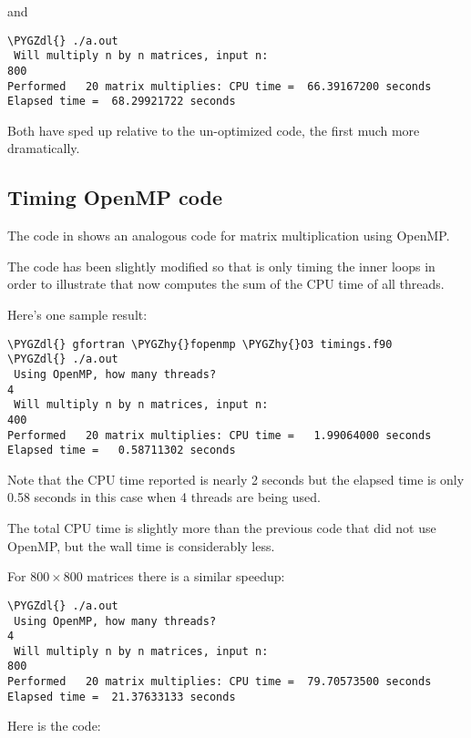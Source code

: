 \documentclass[letterpaper,10pt,english]{sphinxmanual}
\def\PYGZdl{\char`\$}
\def\PYGZhy{\char`\-}
\begin{document}
and

\begin{Verbatim}[commandchars=\\\{\}]
\PYGZdl{} ./a.out
 Will multiply n by n matrices, input n:
800
Performed   20 matrix multiplies: CPU time =  66.39167200 seconds
Elapsed time =  68.29921722 seconds
\end{Verbatim}

Both have sped up relative to the un-optimized code, the first much more
dramatically.


\subsection{Timing OpenMP code}
\label{timing:timing-openmp-code}
The code in  shows an analogous code for
matrix multiplication using OpenMP.

The code has been slightly modified so that  is only timing
the inner loops in order to illustrate that  now computes the sum
of the CPU time of all threads.

Here's one sample result:

\begin{Verbatim}[commandchars=\\\{\}]
\PYGZdl{} gfortran \PYGZhy{}fopenmp \PYGZhy{}O3 timings.f90
\PYGZdl{} ./a.out
 Using OpenMP, how many threads?
4
 Will multiply n by n matrices, input n:
400
Performed   20 matrix multiplies: CPU time =   1.99064000 seconds
Elapsed time =   0.58711302 seconds
\end{Verbatim}

Note that the CPU time reported is nearly 2 seconds but the elapsed time is
only 0.58 seconds in this case when 4 threads are being used.

The total CPU time is slightly more than the previous code that did not use
OpenMP, but the wall time is considerably less.

For \(800\times 800\) matrices there is a similar speedup:

\begin{Verbatim}[commandchars=\\\{\}]
\PYGZdl{} ./a.out
 Using OpenMP, how many threads?
4
 Will multiply n by n matrices, input n:
800
Performed   20 matrix multiplies: CPU time =  79.70573500 seconds
Elapsed time =  21.37633133 seconds
\end{Verbatim}

Here is the code:
\end{document}
